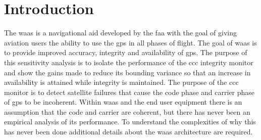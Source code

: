 \chapter{Introduction}
\label{chapter:introduction}
\acresetall
The \ac{waas} is a navigational aid developed by the \ac{faa} with the goal of giving aviation users the ability to use the \ac{gps} in all phases of flight. The goal of \ac{waas} is to provide improved accuracy, integrity and availability of \ac{gps}. The purpose of this sensitivity analysis is to isolate the performance of the \ac{ccc} integrity monitor and show the gains made to reduce its bounding variance so that an increase in availability is attained while integrity is maintained. The purpose of the \ac{ccc} monitor is to detect satellite failures that cause the code phase and carrier phase of \ac{gps} to be incoherent.  Within \ac{waas} and the end user equipment there is an assumption that the code and carrier are coherent, but there has never been an empirical analysis of its performance.  To understand the complexities of why this has never been done additional details about the \ac{waas} architecture are required.

